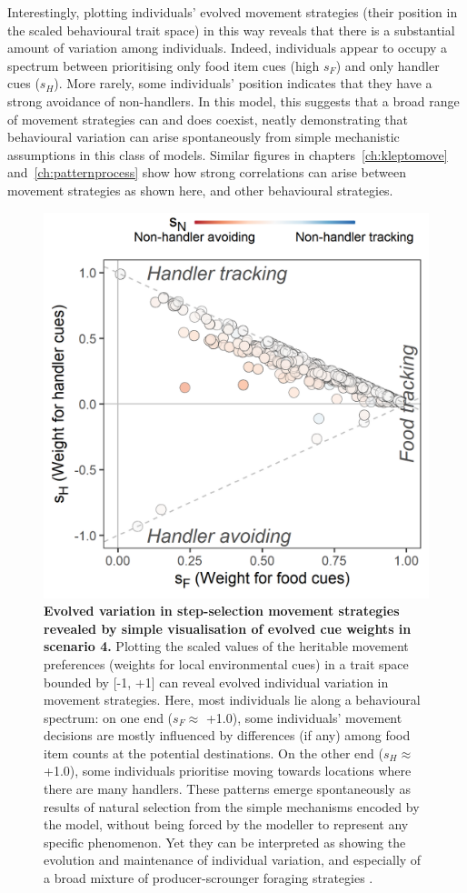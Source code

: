 \begin{interludeenv}
Interestingly, plotting individuals' evolved movement strategies (their position in the scaled behavioural trait space) in this way reveals that there is a substantial amount of variation among individuals.
Indeed, individuals appear to occupy a spectrum between prioritising only food item cues (high $s_F$) and only handler cues ($s_H$).
More rarely, some individuals' position indicates that they have a strong avoidance of non-handlers.
In this model, this suggests that a broad range of movement strategies can and does coexist, neatly demonstrating that behavioural variation can arise spontaneously from simple mechanistic assumptions in this class of models.
Similar figures in chapters~\ref{ch:kleptomove} and~\ref{ch:patternprocess} show how strong correlations can arise between movement strategies as shown here, and other behavioural strategies.

\begin{figure}[h]
    \centering
    \includegraphics[width=0.7\linewidth]{figures/introduction/fig_hypervolume.png}
    \caption{
        \textbf{Evolved variation in step-selection movement strategies revealed by simple visualisation of evolved cue weights in scenario 4.}
        Plotting the scaled values of the heritable movement preferences (weights for local environmental cues) in a trait space bounded by [-1, +1] can reveal evolved individual variation in movement strategies. Here, most individuals lie along a behavioural spectrum: on one end ($s_F \approx$ +1.0), some individuals' movement decisions are mostly influenced by differences (if any) among food item counts at the potential destinations. On the other end ($s_H \approx$ +1.0), some individuals prioritise moving towards locations where there are many handlers.
        These patterns emerge spontaneously as results of natural selection from the simple mechanisms encoded by the model, without being forced by the modeller to represent any specific phenomenon. Yet they can be interpreted as showing the evolution and maintenance of individual variation, and especially of a broad mixture of producer-scrounger foraging strategies \parencite{beauchamp2008}.
    }
    \label{fig:demo_hypervolume}
  \end{figure}


\end{interludeenv}
